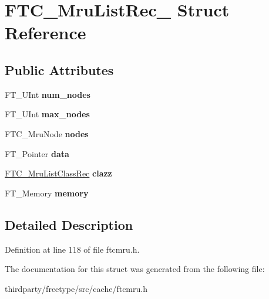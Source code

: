 \hypertarget{struct_f_t_c___mru_list_rec__}{}\section{F\+T\+C\+\_\+\+Mru\+List\+Rec\+\_\+ Struct Reference}
\label{struct_f_t_c___mru_list_rec__}
\subsection*{Public Attributes}
\begin{DoxyCompactItemize}
\item 
\mbox{\label{struct_f_t_c___mru_list_rec___ad7b6db28b89a8ffd14bb97e700418af4}} 
F\+T\+\_\+\+U\+Int {\bfseries num\+\_\+nodes}
\item 
\mbox{\label{struct_f_t_c___mru_list_rec___aba9c616ac3b931f9d46e87f122e64843}} 
F\+T\+\_\+\+U\+Int {\bfseries max\+\_\+nodes}
\item 
\mbox{\label{struct_f_t_c___mru_list_rec___a7ecf518fe77c341d2db31e1df8ebc231}} 
F\+T\+C\+\_\+\+Mru\+Node {\bfseries nodes}
\item 
\mbox{\label{struct_f_t_c___mru_list_rec___a907d4b6efcbaa83610e9f55710cf434f}} 
F\+T\+\_\+\+Pointer {\bfseries data}
\item 
\mbox{\label{struct_f_t_c___mru_list_rec___a83a983844599958c0647f74db67d5926}} 
\hyperlink{struct_f_t_c___mru_list_class_rec__}{F\+T\+C\+\_\+\+Mru\+List\+Class\+Rec} {\bfseries clazz}
\item 
\mbox{\label{struct_f_t_c___mru_list_rec___a6a7a6ed35fb525fa9f7bdb1b12a4213d}} 
F\+T\+\_\+\+Memory {\bfseries memory}
\end{DoxyCompactItemize}


\subsection{Detailed Description}


Definition at line 118 of file ftcmru.\+h.



The documentation for this struct was generated from the following file\+:\begin{DoxyCompactItemize}
\item 
thirdparty/freetype/src/cache/ftcmru.\+h\end{DoxyCompactItemize}
